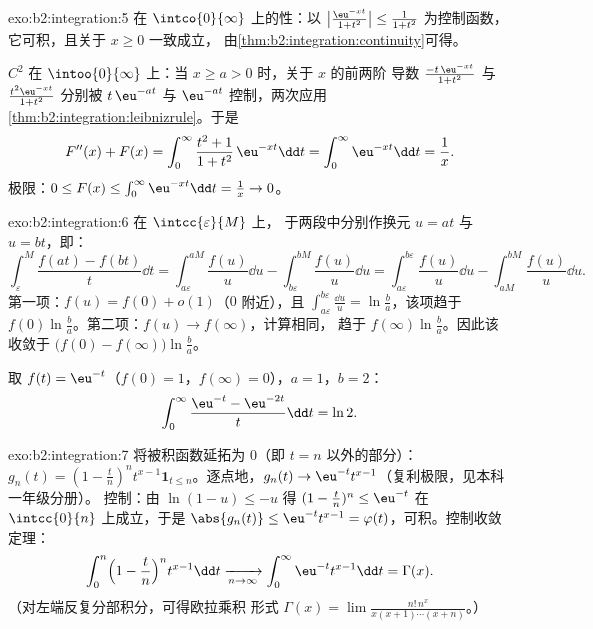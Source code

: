 \begin{solution}{exo:b2:integration:5}
在 $\intco{0}{\infty}$ 上的性：以
$\bigl|\frac{\eu^{-xt}}{1+t^2}\bigr| \leq \frac{1}{1+t^2}$ 为控制函数，
它可积，且关于 $x \geq 0$ 一致成立，
由\cref{thm:b2:integration:continuity}可得。

$C^2$ 在 $\intoo{0}{\infty}$ 上：当 $x \geq a > 0$ 时，关于 $x$ 的前两阶
导数 $\frac{-t\,\eu^{-xt}}{1+t^2}$ 与
$\frac{t^2\eu^{-xt}}{1+t^2}$ 分别被 $t\,\eu^{-at}$ 与
$\eu^{-at}$ 控制，两次应用
\cref{thm:b2:integration:leibnizrule}。于是
\[
F''(x) + F(x) = \int_0^\infty \frac{t^2 + 1}{1 + t^2}\,\eu^{-xt}\dd
t = \int_0^\infty \eu^{-xt}\dd t = \frac1x .
\]
极限：$0 \leq F(x) \leq \int_0^\infty \eu^{-xt}\dd t = \frac1x \to
0$。
\end{solution}

\begin{solution}{exo:b2:integration:6}
在 $\intcc{\varepsilon}{M}$ 上，
于两段中分别作换元 $u = at$ 与 $u = bt$，即：
\[
\int_\varepsilon^M \frac{f(at) - f(bt)}{t}\dd t
= \int_{a\varepsilon}^{aM}\frac{f(u)}{u}\dd u
- \int_{b\varepsilon}^{bM}\frac{f(u)}{u}\dd u
= \int_{a\varepsilon}^{b\varepsilon} \frac{f(u)}{u}\dd u
- \int_{aM}^{bM} \frac{f(u)}{u}\dd u .
\]
第一项：$f(u) = f(0) + o(1)$（$0$ 附近），且 $\int_{a\varepsilon}
^{b\varepsilon} \frac{\dd u}{u} = \ln\frac ba$，该项趋于
$f(0)\ln\frac ba$。第二项：$f(u) \to f(\infty)$，计算相同，
趋于 $f(\infty)\ln\frac ba$。因此该
收敛于 $\bigl(f(0) - f(\infty)\bigr)\ln\frac ba$。

取 $f(t) = \eu^{-t}$（$f(0) = 1$，$f(\infty) = 0$），$a = 1$，$b
= 2$：
\[
\int_0^\infty \frac{\eu^{-t} - \eu^{-2t}}{t}\dd t = \ln 2 .
\]
\end{solution}

\begin{solution}{exo:b2:integration:7}
将被积函数延拓为 $0$（即 $t = n$ 以外的部分）：$g_n(t) = (1 -
\frac tn)^n t^{x-1}\mathbf{1}_{t \leq n}$。逐点地，$g_n(t) \to
\eu^{-t}t^{x-1}$（复利极限，见本科一年级分册）。
控制：由 $\ln(1 - u) \leq -u$ 得 $(1 - \frac tn)^n \leq
\eu^{-t}$ 在 $\intcc{0}{n}$ 上成立，于是 $\abs{g_n(t)} \leq
\eu^{-t}t^{x-1} = \varphi(t)$，可积。控制收敛定理：
\[
\int_0^n \Bigl(1 - \frac tn\Bigr)^n t^{x-1}\dd t
\xrightarrow[n\to\infty]{} \int_0^\infty \eu^{-t}t^{x-1}\dd t
= \Gamma(x) .
\]
（对左端反复分部积分，可得欧拉乘积
形式 $\Gamma(x) = \lim \frac{n!\,n^x}{x(x+1)\cdots(x+n)}$。）
\end{solution}

